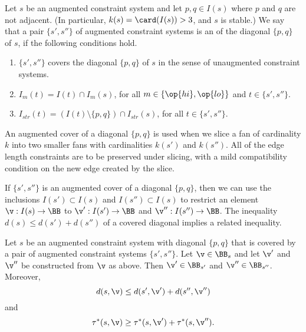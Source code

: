 \begin{definition}
 Let $s$ be an augmented constraint system and let $p,q\in I(s)$ where $p$ and
  $q$ are not adjacent.  (In particular, $k(s)=\card(I(s))>3$, and $s$ is stable.)  We
  say that a pair $\{s',s''\}$ of augmented constraint systems is an
 of  the
  diagonal $\{p,q\}$ of $s$, if the following conditions hold.
\begin{enumerate}
\item $\{s',s''\}$ covers the diagonal $\{p,q\}$ of $s$ in the sense of unaugmented
constraint systems.
\item
$I_m(t) = I(t)\cap I_m(s)$, for all $m\in\{\op{hi},\op{lo}\}$ and $t\in \{s',s''\}$.
\item
$I_{str}(t) = (I(t)\setminus \{p,q\})\cap I_{str}(s)$, for all $t\in \{s',s''\}$.
\end{enumerate}
\end{definition}

An augmented cover of a diagonal $\{p,q\}$ is used when we slice a fan of cardinality $k$ into two smaller fans with cardinalities $k(s')$ and $k(s'')$.  All of the edge length constraints are to be preserved under slicing, with a mild compatibility condition on the new edge created by the slice.

If $\{s',s''\}$ is an augmented cover of a diagonal $\{p,q\}$, then we can use the inclusions $I(s')\subset I(s)$ and $I(s'')\subset I(s)$ to restrict an element $\v:I(s)\to\BB$ to $\v':I(s')\to \BB$ and $\v'':I(s'')\to \BB$.  The inequality $d(s)\le d(s') + d(s'')$ of a covered diagonal implies a related inequality.

\begin{lemma}\label{lemma:cover2}
Let $s$ be an augmented constraint system with diagonal $\{p,q\}$ that is covered
by a pair of augmented constraint systems $\{s',s''\}$. 
Let $\v\in \BB_s$ and let $\v'$ and $\v''$ be constructed from $\v$ as above.
Then  $\v'\in \BB_{s'}$ and $\v''\in \BB_{s''}$.
Moreover,
\begin{equation}
d(s,\v) \le d(s',\v') + d(s'',\v'')
\end{equation}
and
\begin{equation}
\tau^*(s,\v)\ge \tau^*(s,\v')+\tau^*(s,\v'').
\end{equation}
\end{lemma}

